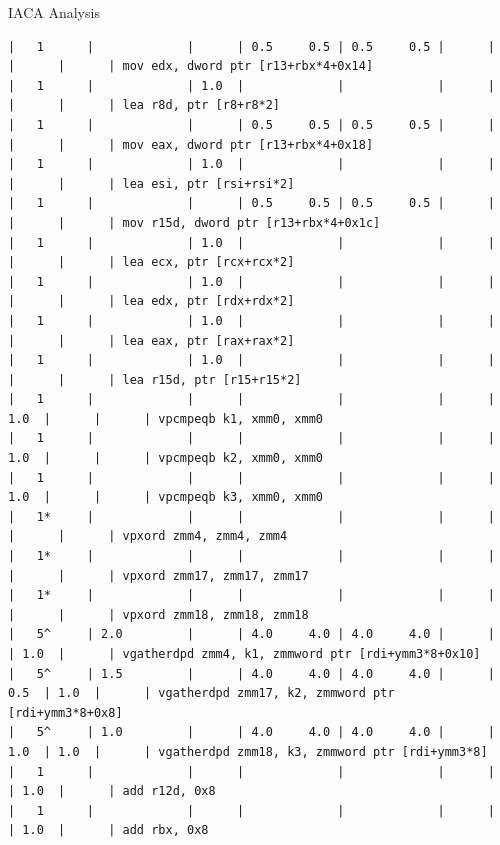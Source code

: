 \documentclass[aspectratio=169,t]{beamer}
\begin{document}
  \begin{frame}[fragile]{IACA Analysis}
    \vspace{-20pt}
    \begin{lstlisting}[basicstyle=\tt\fontsize{4pt}{6pt}\selectfont]
|   1      |             |      | 0.5     0.5 | 0.5     0.5 |      |      |      |      | mov edx, dword ptr [r13+rbx*4+0x14]
|   1      |             | 1.0  |             |             |      |      |      |      | lea r8d, ptr [r8+r8*2]
|   1      |             |      | 0.5     0.5 | 0.5     0.5 |      |      |      |      | mov eax, dword ptr [r13+rbx*4+0x18]
|   1      |             | 1.0  |             |             |      |      |      |      | lea esi, ptr [rsi+rsi*2]
|   1      |             |      | 0.5     0.5 | 0.5     0.5 |      |      |      |      | mov r15d, dword ptr [r13+rbx*4+0x1c]
|   1      |             | 1.0  |             |             |      |      |      |      | lea ecx, ptr [rcx+rcx*2]
|   1      |             | 1.0  |             |             |      |      |      |      | lea edx, ptr [rdx+rdx*2]
|   1      |             | 1.0  |             |             |      |      |      |      | lea eax, ptr [rax+rax*2]
|   1      |             | 1.0  |             |             |      |      |      |      | lea r15d, ptr [r15+r15*2]
|   1      |             |      |             |             |      | 1.0  |      |      | vpcmpeqb k1, xmm0, xmm0
|   1      |             |      |             |             |      | 1.0  |      |      | vpcmpeqb k2, xmm0, xmm0
|   1      |             |      |             |             |      | 1.0  |      |      | vpcmpeqb k3, xmm0, xmm0
|   1*     |             |      |             |             |      |      |      |      | vpxord zmm4, zmm4, zmm4
|   1*     |             |      |             |             |      |      |      |      | vpxord zmm17, zmm17, zmm17
|   1*     |             |      |             |             |      |      |      |      | vpxord zmm18, zmm18, zmm18
|   5^     | 2.0         |      | 4.0     4.0 | 4.0     4.0 |      |      | 1.0  |      | vgatherdpd zmm4, k1, zmmword ptr [rdi+ymm3*8+0x10]
|   5^     | 1.5         |      | 4.0     4.0 | 4.0     4.0 |      | 0.5  | 1.0  |      | vgatherdpd zmm17, k2, zmmword ptr [rdi+ymm3*8+0x8]
|   5^     | 1.0         |      | 4.0     4.0 | 4.0     4.0 |      | 1.0  | 1.0  |      | vgatherdpd zmm18, k3, zmmword ptr [rdi+ymm3*8]
|   1      |             |      |             |             |      |      | 1.0  |      | add r12d, 0x8
|   1      |             |      |             |             |      |      | 1.0  |      | add rbx, 0x8

\end{lstlisting}
\end{frame}
\end{document}
